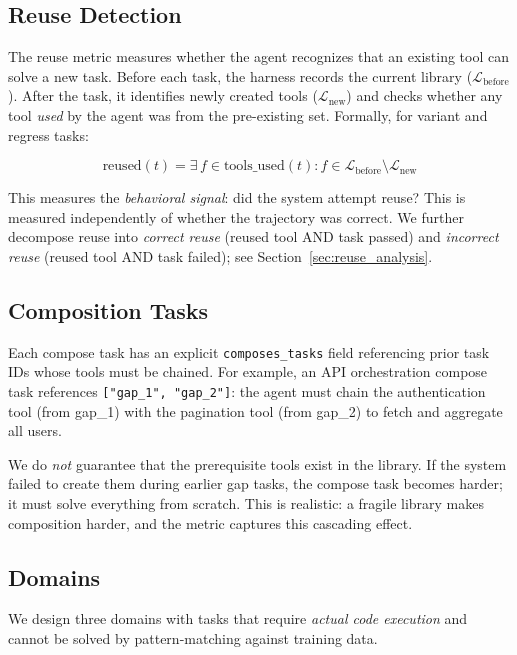 \documentclass[sigplan,review,anonymous]{acmart}
\begin{document}
\subsection{Reuse Detection}
\label{sec:reuse}

The reuse metric measures whether the agent recognizes that an existing tool can solve a new task. Before each task, the harness records the current library ($\mathcal{L}_{\text{before}}$). After the task, it identifies newly created tools ($\mathcal{L}_{\text{new}}$) and checks whether any tool \emph{used} by the agent was from the pre-existing set. Formally, for variant and regress tasks:

\begin{equation}
\text{reused}(t) = \exists\, f \in \text{tools\_used}(t) : f \in \mathcal{L}_{\text{before}} \setminus \mathcal{L}_{\text{new}}
\end{equation}

This measures the \emph{behavioral signal}: did the system attempt reuse? This is measured independently of whether the trajectory was correct. We further decompose reuse into \emph{correct reuse} (reused tool AND task passed) and \emph{incorrect reuse} (reused tool AND task failed); see Section~\ref{sec:reuse_analysis}.

\subsection{Composition Tasks}
\label{sec:compose}

Each compose task has an explicit \texttt{composes\_tasks} field referencing prior task IDs whose tools must be chained. For example, an API orchestration compose task references \texttt{["gap\_1", "gap\_2"]}: the agent must chain the authentication tool (from gap\_1) with the pagination tool (from gap\_2) to fetch and aggregate all users.

We do \emph{not} guarantee that the prerequisite tools exist in the library. If the system failed to create them during earlier gap tasks, the compose task becomes harder; it must solve everything from scratch. This is realistic: a fragile library makes composition harder, and the metric captures this cascading effect.

\subsection{Domains}
\label{sec:domains}

We design three domains with tasks that require \emph{actual code execution} and cannot be solved by pattern-matching against training data.
\end{document}
